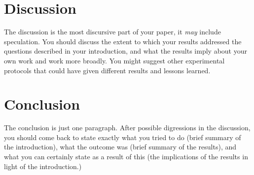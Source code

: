 \documentclass[a4paper,12pt]{article}
\begin{document}
\section{Discussion}

The discussion is the most discursive part of your paper, it {\em may}
include speculation. You should discuss the extent to which your
results addressed the questions described in your introduction, and
what the results imply about your own work and work more broadly.  You
might suggest other experimental protocols that could have given
different results and lessons learned.

\section{Conclusion}
The conclusion is just one paragraph.  After possible digressions in
the discussion, you should come back to state exactly what you tried
to do (brief summary of the introduction), what the outcome was (brief
summary of the results), and what you can certainly state as a
result of this (the implications of the results in light of the introduction.)



\end{document}
